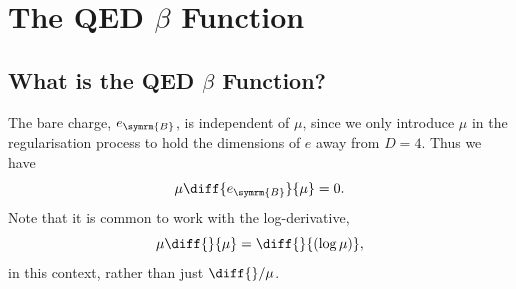 \documentclass[fleqn]{NotesClass}
\newcommand{\bare}{\symrm{B}}
\begin{document}
    
    \chapter{The QED \texorpdfstring{\(\beta\)}{beta} Function}
    \section{What is the QED \texorpdfstring{\(\beta\)}{beta} Function?}
    The bare charge, \(e_{\bare}\), is independent of \(\mu\), since we only introduce \(\mu\) in the regularisation process to hold the dimensions of \(e\) away from \(D = 4\).
    Thus we have
    \begin{equation}
        \mu \diff{e_{\bare}}{\mu} = 0.
    \end{equation}
    Note that it is common to work with the log-derivative,
    \begin{equation}
        \mu \diff{}{\mu} = \diff{}{(\log \mu)},
    \end{equation}
    in this context, rather than just \(\diff{}/{\mu}\).
    
\end{document}
